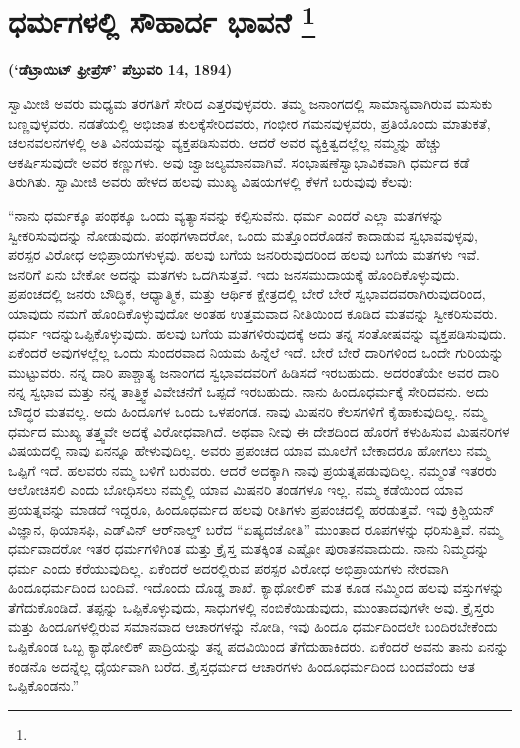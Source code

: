 
\chapter[ಧರ್ಮಗಳಲ್ಲಿ ಸೌಹಾರ್ದ ಭಾವನೆ ]{ಧರ್ಮಗಳಲ್ಲಿ ಸೌಹಾರ್ದ ಭಾವನೆ \protect\footnote{}}

\centerline{\textbf{(‘ಡೆಟ್ರಾಯಿಟ್​ ಫ್ರೀಪ್ರೆಸ್​’ ಪೆಬ್ರುವರಿ 14, 1894)}}

\vskip 5pt

ಸ್ವಾಮೀಜಿ ಅವರು ಮಧ್ಯಮ ತರಗತಿಗೆ ಸೇರಿದ ಎತ್ತರವುಳ್ಳವರು. ತಮ್ಮ ಜನಾಂಗದಲ್ಲಿ ಸಾಮಾನ್ಯವಾಗಿರುವ ಮಸುಕು ಬಣ್ಣವುಳ್ಳವರು. ನಡತೆಯಲ್ಲಿ ಅಭಿಜಾತ ಕುಲಕ್ಕೆ\break ಸೇರಿದವರು, ಗಂಭೀರ ಗಮನವುಳ್ಳವರು, ಪ್ರತಿಯೊಂದು ಮಾತುಕತೆ, ಚಲನವಲನಗಳಲ್ಲಿ ಅತಿ ವಿನಯವನ್ನು ವ್ಯಕ್ತಪಡಿಸುವರು. ಆದರೆ ಅವರ ವ್ಯಕ್ತಿತ್ವದಲ್ಲೆಲ್ಲ ನಮ್ಮನ್ನು ಹೆಚ್ಚು ಆಕರ್ಷಿಸುವುದೇ ಅವರ ಕಣ್ಣುಗಳು. ಅವು ಜ್ವಾಜಲ್ಯಮಾನವಾಗಿವೆ. ಸಂಭಾಷಣೆ\break ಸ್ವಾಭಾವಿಕವಾಗಿ ಧರ್ಮದ ಕಡೆ ತಿರುಗಿತು. ಸ್ವಾಮೀಜಿ ಅವರು ಹೇಳದ ಹಲವು ಮುಖ್ಯ ವಿಷಯಗಳಲ್ಲಿ ಕೆಳಗೆ ಬರುವುವು ಕೆಲವು:

\vskip 5pt

“ನಾನು ಧರ್ಮಕ್ಕೂ ಪಂಥಕ್ಕೂ ಒಂದು ವ್ಯತ್ಯಾಸವನ್ನು ಕಲ್ಪಿಸುವೆನು. ಧರ್ಮ ಎಂದರೆ ಎಲ್ಲಾ ಮತಗಳನ್ನು ಸ್ವೀಕರಿಸುವುದನ್ನು ನೋಡುವುದು. ಪಂಥಗಳಾದರೋ, ಒಂದು ಮತ್ತೊಂದರೊಡನೆ ಕಾದಾಡುವ ಸ್ವಭಾವವುಳ್ಳವು, ಪರಸ್ಪರ ವಿರೋಧ ಅಭಿಪ್ರಾಯಗಳುಳ್ಳವು. ಹಲವು ಬಗೆಯ ಜನರಿರುವುದರಿಂದ ಹಲವು ಬಗೆಯ ಮತಗಳು ಇವೆ. ಜನರಿಗೆ ಏನು ಬೇಕೋ ಅದನ್ನು ಮತಗಳು ಒದಗಿಸುತ್ತವೆ. ಇದು ಜನಸಮುದಾಯಕ್ಕೆ ಹೊಂದಿಕೊಳ್ಳುವುದು. ಪ್ರಪಂಚದಲ್ಲಿ ಜನರು ಬೌದ್ಧಿಕ, ಆಧ್ಯಾತ್ಮಿಕ, ಮತ್ತು ಆರ್ಥಿಕ ಕ್ಷೇತ್ರದಲ್ಲಿ ಬೇರೆ ಬೇರೆ ಸ್ವಭಾವದವರಾಗಿರುವುದರಿಂದ, ಯಾವುದು ನಮಗೆ ಹೊಂದಿಕೊಳ್ಳುವುದೋ ಅಂತಹ ಉತ್ತಮವಾದ ನೀತಿಯಿಂದ ಕೂಡಿದ ಮತವನ್ನು ಸ್ವೀಕರಿಸುವರು. ಧರ್ಮ ಇದನ್ನು\break ಒಪ್ಪಿಕೊಳ್ಳುವುದು. ಹಲವು ಬಗೆಯ ಮತಗಳಿರುವುದಕ್ಕೆ ಅದು ತನ್ನ ಸಂತೋಷವನ್ನು ವ್ಯಕ್ತಪಡಿಸುವುದು. ಏಕೆಂದರೆ ಅವುಗಳಲ್ಲೆಲ್ಲ ಒಂದು ಸುಂದರವಾದ ನಿಯಮ ಹಿನ್ನೆಲೆ ಇದೆ. ಬೇರೆ ಬೇರೆ ದಾರಿಗಳಿಂದ ಒಂದೇ ಗುರಿಯನ್ನು ಮುಟ್ಟುವರು. ನನ್ನ ದಾರಿ ಪಾಶ್ಚಾತ್ಯ ಜನಾಂಗದ ಸ್ವಭಾವದವರಿಗೆ ಹಿಡಿಸದೆ ಇರಬಹುದು. ಅದರಂತೆಯೇ ಅವರ ದಾರಿ ನನ್ನ ಸ್ವಭಾವ ಮತ್ತು ನನ್ನ ತಾತ್ತ್ವಿಕ ವಿವೇಚನೆಗೆ ಒಪ್ಪದೆ ಇರಬಹುದು. ನಾನು ಹಿಂದೂಧರ್ಮಕ್ಕೆ ಸೇರಿದವನು. ಅದು ಬೌದ್ಧರ ಮತವಲ್ಲ. ಅದು ಹಿಂದೂಗಳ ಒಂದು ಒಳಪಂಗಡ. ನಾವು ಮಿಷನರಿ ಕೆಲಸಗಳಿಗೆ ಕೈಹಾಕುವುದಿಲ್ಲ. ನಮ್ಮ ಧರ್ಮದ ಮುಖ್ಯ ತತ್ತ್ವವೇ ಅದಕ್ಕೆ ವಿರೋಧವಾಗಿದೆ. ಅಥವಾ ನೀವು ಈ ದೇಶದಿಂದ ಹೊರಗೆ ಕಳುಹಿಸುವ ಮಿಷನರಿಗಳ ವಿಷಯದಲ್ಲಿ ನಾವು ಏನನ್ನೂ ಹೇಳುವುದಿಲ್ಲ. ಅವರು ಪ್ರಪಂಚದ ಯಾವ ಮೂಲೆಗೆ ಬೇಕಾದರೂ ಹೋಗಲು ನಮ್ಮ ಒಪ್ಪಿಗೆ ಇದೆ. ಹಲವರು ನಮ್ಮ ಬಳಿಗೆ ಬರುವರು. ಆದರೆ ಅದಕ್ಕಾಗಿ ನಾವು ಪ್ರಯತ್ನಪಡುವುದಿಲ್ಲ. ನಮ್ಮಂತೆ ಇತರರು ಆಲೋಚಿಸಲಿ ಎಂದು ಬೋಧಿಸಲು ನಮ್ಮಲ್ಲಿ ಯಾವ ಮಿಷನರಿ ತಂಡಗಳೂ ಇಲ್ಲ. ನಮ್ಮ ಕಡೆಯಿಂದ ಯಾವ ಪ್ರಯತ್ನವನ್ನು ಮಾಡದೆ ಇದ್ದರೂ, ಹಿಂದೂಧರ್ಮದ ಹಲವು ರೀತಿಗಳು ಪ್ರಪಂಚದಲ್ಲಿ ಹರಡುತ್ತವೆ. ಇವು ಕ್ರಿಶ್ಚಿಯನ್​ ವಿಜ್ಞಾನ, ಥಿಯಾಸಫಿ, ಎಡ್​ವಿನ್​ ಆರ್​ನಾಲ್ಡ್​ ಬರೆದ “ಏಷ್ಯದಜೋತಿ” ಮುಂತಾದ ರೂಪಗಳನ್ನು ಧರಿಸುತ್ತಿವೆ. ನಮ್ಮ ಧರ್ಮವಾದರೋ ಇತರ ಧರ್ಮಗಳಿಗಿಂತ ಮತ್ತು ಕ್ರೈಸ್ತ ಮತಕ್ಕಿಂತ ಎಷ್ಟೋ ಪುರಾತನವಾದುದು. ನಾನು ನಿಮ್ಮದನ್ನು ಧರ್ಮ ಎಂದು ಕರೆಯುವುದಿಲ್ಲ. ಏಕೆಂದರೆ ಅದರಲ್ಲಿರುವ ಪರಸ್ಪರ ವಿರೋಧ ಅಭಿಪ್ರಾಯಗಳು ನೇರವಾಗಿ ಹಿಂದೂಧರ್ಮದಿಂದ ಬಂದಿವೆ. ಇದೊಂದು ದೊಡ್ಡ ಶಾಖೆ. ಕ್ಯಾಥೋಲಿಕ್​ ಮತ ಕೂಡ ನಮ್ಮಿಂದ ಹಲವು ವಸ್ತುಗಳನ್ನು ತೆಗೆದುಕೊಂಡಿದೆ. ತಪ್ಪನ್ನು ಒಪ್ಪಿಕೊಳ್ಳುವುದು, ಸಾಧುಗಳಲ್ಲಿ ನಂಬಿಕೆಯಿಡುವುದು, ಮುಂತಾದವುಗಳೇ ಅವು. ಕ್ರೈಸ್ತರು ಮತ್ತು ಹಿಂದೂಗಳಲ್ಲಿರುವ ಸಮಾನವಾದ ಆಚಾರಗಳನ್ನು ನೋಡಿ, ಇವು ಹಿಂದೂ ಧರ್ಮದಿಂದಲೇ ಬಂದಿರಬೇಕೆಂದು ಒಪ್ಪಿಕೊಂಡ ಒಬ್ಬ ಕ್ಯಾಥೋಲಿಕ್​ ಪಾದ್ರಿಯನ್ನು ತನ್ನ ಪದವಿಯಿಂದ ತೆಗೆದುಹಾಕಿದರು. ಏಕೆಂದರೆ ಅವನು ತಾನು ಏನನ್ನು ಕಂಡನೊ ಅದನ್ನೆಲ್ಲ ಧೈರ್ಯವಾಗಿ ಬರೆದ. ಕ್ರೈಸ್ತಧರ್ಮದ ಆಚಾರಗಳು ಹಿಂದೂಧರ್ಮದಿಂದ ಬಂದವೆಂದು ಆತ ಒಪ್ಪಿಕೊಂಡನು.”

